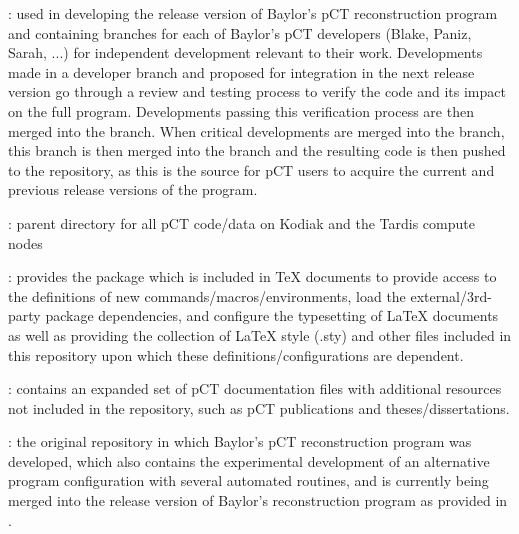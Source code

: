 \begin{tcbfunctionenv}
\begin{tcbparagraph}
\begin{deepList}[labelindent=1pt, leftmargin=*]
\begin{deepList}[labelindent=1pt, leftmargin=*]
		\item {} : used in developing the release version of Baylor's pCT reconstruction program and containing branches for each of Baylor's pCT developers (Blake, Paniz, Sarah, ...) for independent development relevant to their work.  Developments made in a developer branch and proposed for integration in the next release version go through a review and testing process to verify the code and its impact on the full program.  Developments passing this verification process are then merged into the  branch.  When critical developments are merged into the  branch, this branch is then merged into the  branch and the resulting code is then pushed to the  repository, as this is the source for pCT users to acquire the current and previous release versions of the program.
	\end{deepList}
	\item {} : parent directory for all pCT code/data on Kodiak and the Tardis compute nodes
	\begin{deepList}[labelindent=1pt, leftmargin=*]
		\item {} : provides the package  which is included in TeX documents to provide access to the definitions of new commands/macros/environments, load the external/3rd-party package dependencies, and configure the typesetting of LaTeX documents as well as providing the collection of LaTeX style (.sty) and other files included in this repository upon which these definitions/configurations are dependent.
		\item {} : contains an expanded set of pCT documentation files with additional resources not included in the  repository, such as pCT publications and theses/dissertations.
		\item {} : the original repository in which Baylor's pCT reconstruction program was developed, which also contains the experimental development of an alternative program configuration with several automated routines, and is currently being merged into the release version of Baylor's reconstruction program as provided in .

\end{deepList}
\end{deepList}
\end{tcbparagraph}
\end{tcbfunctionenv}
